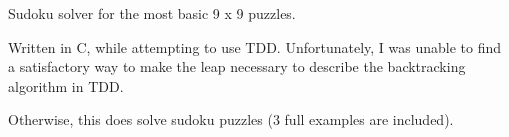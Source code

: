 Sudoku solver for the most basic 9 x 9 puzzles.

Written in C, while attempting to use T\+DD. Unfortunately, I was unable to find a satisfactory way to make the leap necessary to describe the backtracking algorithm in T\+DD.

Otherwise, this does solve sudoku puzzles (3 full examples are included). 